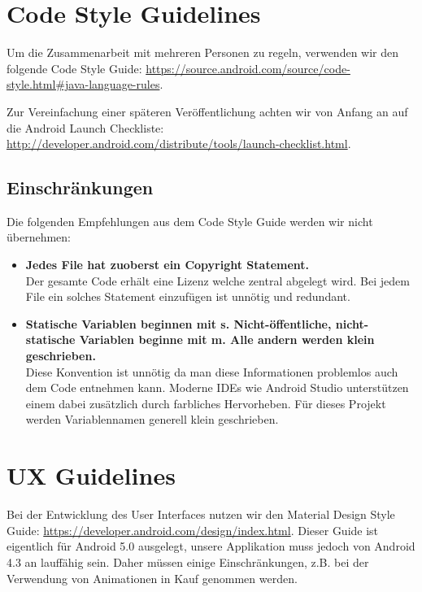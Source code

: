 \section{Code Style Guidelines}
\label{sec:Code Style Guidelines}

Um die Zusammenarbeit mit mehreren Personen zu regeln, verwenden wir den folgende Code Style Guide: \url{https://source.android.com/source/code-style.html#java-language-rules}.

Zur Vereinfachung einer späteren Veröffentlichung achten wir von Anfang an auf die Android Launch Checkliste: \url{http://developer.android.com/distribute/tools/launch-checklist.html}.

\subsection{Einschränkungen}
Die folgenden Empfehlungen aus dem Code Style Guide werden wir nicht übernehmen:

\begin{itemize}
\item \textbf{Jedes File hat zuoberst ein Copyright Statement.} \\ Der gesamte Code erhält eine Lizenz welche zentral abgelegt wird. Bei jedem File ein solches Statement einzufügen ist unnötig und redundant.
\item \textbf{Statische Variablen beginnen mit s. Nicht-öffentliche, nicht-statische Variablen beginne mit m. Alle andern werden klein geschrieben.} \\ Diese Konvention ist unnötig da man diese Informationen problemlos auch dem Code entnehmen kann. Moderne IDEs wie Android Studio unterstützen einem dabei zusätzlich durch farbliches Hervorheben. Für dieses Projekt werden Variablennamen generell klein geschrieben.
\end{itemize}

\section{UX Guidelines}
\label{sec:UX Guidelines}

Bei der Entwicklung des User Interfaces nutzen wir den Material Design Style Guide:
\url{https://developer.android.com/design/index.html}. Dieser Guide ist eigentlich für Android 5.0 ausgelegt, unsere Applikation muss jedoch von Android 4.3 an lauffähig sein. Daher müssen einige Einschränkungen, z.B. bei der Verwendung von Animationen in Kauf genommen werden.
